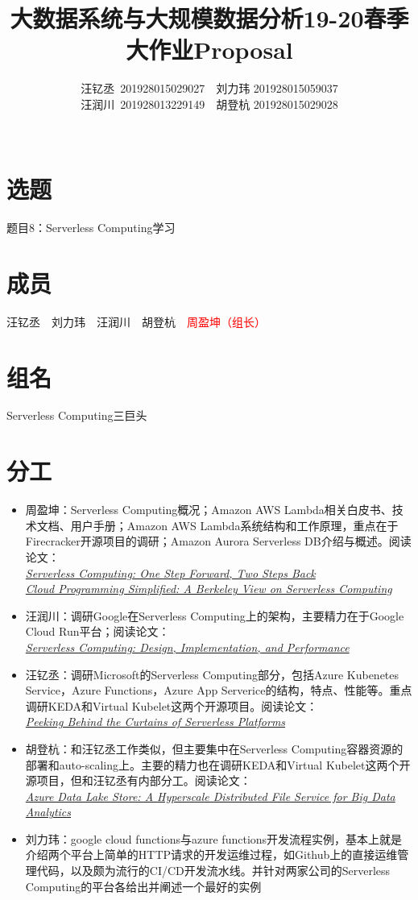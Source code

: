 \documentclass[11pt]{article}
\title{大数据系统与大规模数据分析19-20春季大作业Proposal}
\author{汪钇丞\ 201928015029027\ \ 刘力玮 201928015059037 \\
		汪润川\ 201928013229149\ \ 胡登杭 201928015029028 \\
	\Name\ \ \SID}
\date{}
\begin{document}
\maketitle

\section{选题}
题目8：Serverless Computing学习

\section{成员}
汪钇丞\ \ 刘力玮\ \ 汪润川\ \ 胡登杭\ \ \textcolor{red}{周盈坤（组长）}

\section{组名}
Serverless Computing三巨头

\section{分工}
\begin{itemize}
	\item 周盈坤：Serverless Computing概况；Amazon AWS Lambda相关白皮书、技术文档、用户手册；Amazon AWS Lambda系统结构和工作原理，重点在于Firecracker开源项目的调研；Amazon Aurora Serverless DB介绍与概述。阅读论文： \\ \cite{hellerstein2018serverless}\underline{\textit{Serverless Computing: One Step Forward, Two Steps Back}} \\ \cite{jonas2019cloud}\underline{\textit{Cloud Programming Simplified: A Berkeley View on Serverless Computing}}
	\item 汪润川：调研Google在Serverless Computing上的架构，主要精力在于Google Cloud Run平台；阅读论文：\\ \cite{mcgrath2017serverless}\underline{\textit{Serverless Computing:
Design, Implementation, and Performance}}
	\item 汪钇丞：调研Microsoft的Serverless Computing部分，包括Azure Kubenetes Service，Azure Functions，Azure App Serverice的结构，特点、性能等。重点调研KEDA和Virtual Kubelet这两个开源项目。阅读论文：\\ \cite{wang2018peeking}\underline{\textit{Peeking Behind the Curtains
of Serverless Platforms}}
	\item 胡登杭：和汪钇丞工作类似，但主要集中在Serverless Computing容器资源的部署和auto-scaling上。主要的精力也在调研KEDA和Virtual Kubelet这两个开源项目，但和汪钇丞有内部分工。阅读论文：\\ \cite{ramakrishnan2017azure}\underline{\textit{Azure Data Lake Store:
A Hyperscale Distributed File Service for Big Data Analytics}}
	\item 刘力玮：google cloud functions与azure functions开发流程实例，基本上就是介绍两个平台上简单的HTTP请求的开发运维过程，如Github上的直接运维管理代码，以及颇为流行的CI/CD开发流水线。并针对两家公司的Serverless Computing的平台各给出并阐述一个最好的实例
\end{itemize}



\end{document}
